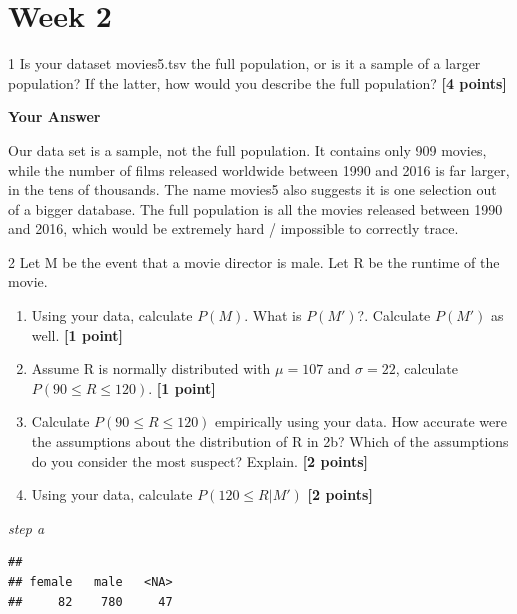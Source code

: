\documentclass[
]{article}
\newenvironment{Shaded}{\begin{snugshade}}{\end{snugshade}}
\newcommand{\AttributeTok}[1]{\textcolor[rgb]{0.13,0.29,0.53}{#1}}
\newcommand{\FunctionTok}[1]{\textcolor[rgb]{0.13,0.29,0.53}{\textbf{#1}}}
\newcommand{\NormalTok}[1]{#1}
\newcommand{\SpecialCharTok}[1]{\textcolor[rgb]{0.81,0.36,0.00}{\textbf{#1}}}
\newcommand{\StringTok}[1]{\textcolor[rgb]{0.31,0.60,0.02}{#1}}
\providecommand{\tightlist}{%
  \setlength{\itemsep}{0pt}\setlength{\parskip}{0pt}}
\begin{document}
\section{Week 2}\label{week-2}

1 Is your dataset movies5.tsv the full population, or is it a sample of
a larger population? If the latter, how would you describe the full
population? \textbf{[4 points]}

\textbf{Your Answer}

Our data set is a sample, not the full population. It contains only 909
movies, while the number of films released worldwide between 1990 and
2016 is far larger, in the tens of thousands. The name movies5 also
suggests it is one selection out of a bigger database. The full
population is all the movies released between 1990 and 2016, which would
be extremely hard / impossible to correctly trace.

2 Let M be the event that a movie director is male. Let R be the runtime
of the movie.

\begin{enumerate}
\def\labelenumi{\alph{enumi}.}
\tightlist
\item
  Using your data, calculate \(P(M)\). What is \(P(M')\)?. Calculate
  \(P(M')\) as well. \textbf{[1 point]}
\item
  Assume R is normally distributed with \(\mu=107\) and \(\sigma=22\),
  calculate \(P(90 \leq R \leq 120)\). \textbf{[1 point]}
\item
  Calculate \(P(90 \leq R \leq 120)\) empirically using your data. How
  accurate were the assumptions about the distribution of R in 2b? Which
  of the assumptions do you consider the most suspect? Explain.
  \textbf{[2 points]}
\item
  Using your data, calculate \(P(120 \leq R | M')\) \textbf{[2 points]}
\end{enumerate}

\emph{step a}

\begin{Shaded}
\end{Shaded}

\begin{verbatim}
## 
## female   male   <NA> 
##     82    780     47
\end{verbatim}
\end{document}
